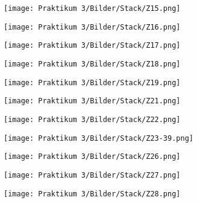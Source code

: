 \documentclass[12pt]{article}
\begin{document}
\begin{figure}[htbp]
    \centering
    \texttt{[image: Praktikum 3/Bilder/Stack/Z15.png]}
\end{figure}
\newpage

\begin{figure}[htbp]
    \centering
    \texttt{[image: Praktikum 3/Bilder/Stack/Z16.png]}
\end{figure}
\newpage

\begin{figure}[htbp]
    \centering
    \texttt{[image: Praktikum 3/Bilder/Stack/Z17.png]}
\end{figure}
\newpage

\begin{figure}[htbp]
    \centering
    \texttt{[image: Praktikum 3/Bilder/Stack/Z18.png]}
\end{figure}
\newpage

\begin{figure}[htbp]
    \centering
    \texttt{[image: Praktikum 3/Bilder/Stack/Z19.png]}
\end{figure}
\newpage

\begin{figure}[htbp]
    \centering
    \texttt{[image: Praktikum 3/Bilder/Stack/Z21.png]}
\end{figure}
\newpage

\begin{figure}[htbp]
    \centering
    \texttt{[image: Praktikum 3/Bilder/Stack/Z22.png]}
\end{figure}
\newpage

\begin{figure}[htbp]
    \centering
    \texttt{[image: Praktikum 3/Bilder/Stack/Z23-39.png]}
\end{figure}
\newpage

\begin{figure}[htbp]
    \centering
    \texttt{[image: Praktikum 3/Bilder/Stack/Z26.png]}
\end{figure}
\newpage

\begin{figure}[htbp]
    \centering
    \texttt{[image: Praktikum 3/Bilder/Stack/Z27.png]}
\end{figure}
\newpage

\begin{figure}[htbp]
    \centering
    \texttt{[image: Praktikum 3/Bilder/Stack/Z28.png]}
\end{figure}
\newpage
\end{document}
